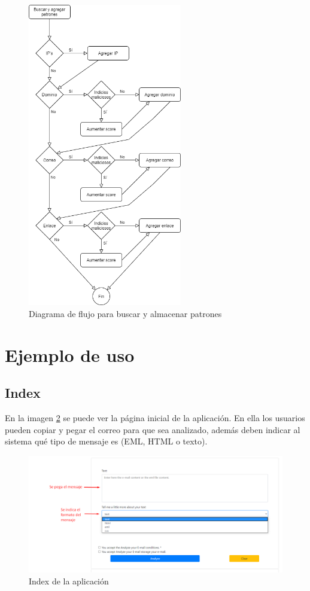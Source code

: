 \begin{figure}[htb]
    \centering
    \includegraphics[width=0.6\textwidth]{imagenes/DiagramasFlujo/Buscar_agregar_patrones.png}
\caption{Diagrama de flujo para buscar y almacenar patrones}
\label{fig:patrones}
\end{figure}
\clearpage
\section{Ejemplo de uso} \label{capturas}
\subsection{Index}
En la imagen \ref{fig:index} se puede ver la página inicial de la aplicación. 
En ella los usuarios pueden copiar y pegar el correo para que sea analizado, además deben indicar al sistema qué tipo de mensaje es (EML, HTML o texto).
\begin{figure}[htb]
    \centering
    \includegraphics[width=\textwidth]{imagenes/capturasAplicacion/Analizar_mensaje.png}
\caption{Index de la aplicación}
\label{fig:index}
\end{figure}

